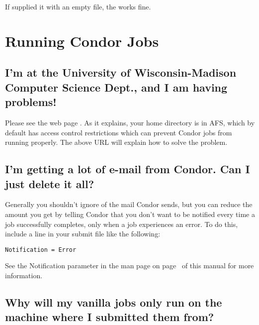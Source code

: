 If supplied it with an empty file, the  works fine.



\section{Running Condor Jobs}

\subsection*{I'm at the University of Wisconsin-Madison Computer Science Dept., and I am having problems!}

Please see the web page .
As
it explains, your home directory is in AFS, which by default has
access control restrictions which can prevent Condor jobs from running
properly.
The above URL will explain how to solve the problem.

\subsection*{I'm getting a lot of e-mail from Condor.  Can I just delete it all?}

Generally you shouldn't ignore  of the mail Condor sends,
but you can reduce the amount you get by telling Condor that you don't
want to be notified every time a job successfully completes, only when
a job experiences an error.
To do this, include a line in your submit file like the following:

\begin{verbatim}
Notification = Error
\end{verbatim}

See the Notification parameter in the  man page on
page~\pageref{man-condor-submit-notification} of this manual for more
information.

\subsection*{Why will my vanilla jobs only run on the machine where I submitted them from?}

